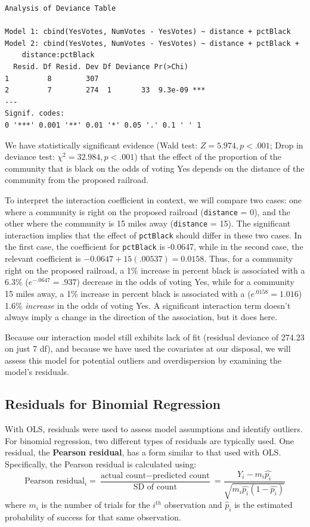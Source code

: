 \documentclass[
]{krantz}
\begin{document}
\begin{verbatim}
Analysis of Deviance Table

Model 1: cbind(YesVotes, NumVotes - YesVotes) ~ distance + pctBlack
Model 2: cbind(YesVotes, NumVotes - YesVotes) ~ distance + pctBlack + 
    distance:pctBlack
  Resid. Df Resid. Dev Df Deviance Pr(>Chi)    
1         8        307                         
2         7        274  1       33  9.3e-09 ***
---
Signif. codes:  
0 '***' 0.001 '**' 0.01 '*' 0.05 '.' 0.1 ' ' 1
\end{verbatim}

We have statistically significant evidence (Wald test: \(Z = 5.974, p<.001\); Drop in deviance test: \(\chi^2=32.984, p<.001\)) that the effect of the proportion of the community that is black on the odds of voting Yes depends on the distance of the community from the proposed railroad.

To interpret the interaction coefficient in context, we will compare two cases: one where a community is right on the proposed railroad (\texttt{distance} = 0), and the other where the community is 15 miles away (\texttt{distance} = 15). The significant interaction implies that the effect of \texttt{pctBlack} should differ in these two cases. In the first case, the coefficient for \texttt{pctBlack} is -0.0647, while in the second case, the relevant coefficient is \(-0.0647+15(.00537) = 0.0158\). Thus, for a community right on the proposed railroad, a 1\% increase in percent black is associated with a 6.3\% (\(e^{-.0647}=.937\)) decrease in the odds of voting Yes, while for a community 15 miles away, a 1\% increase in percent black is associated with a (\(e^{.0158}=1.016\)) 1.6\% \emph{increase} in the odds of voting Yes. A significant interaction term doesn't always imply a change in the direction of the association, but it does here.

Because our interaction model still exhibits lack of fit (residual deviance of 274.23 on just 7 df), and because we have used the covariates at our disposal, we will assess this model for potential outliers and overdispersion by examining the model's residuals.

\hypertarget{residuals-for-binomial-regression}{%
\subsection{Residuals for Binomial Regression}\label{residuals-for-binomial-regression}}

With OLS, residuals were used to assess model assumptions and identify outliers. For binomial regression, two different types of residuals are typically used. One residual, the \textbf{Pearson residual}, has a form similar to that used with OLS. Specifically, the Pearson residual is calculated using:
\begin{equation}
\textrm{Pearson residual}_i = \frac{\textrm{actual count}-\textrm{predicted count}}{\textrm{SD of count}} =
\frac{Y_i-m_i\hat{p_i}}{\sqrt{m_i\hat{p_i}(1-\hat{p_i})}}
\label{eq:pearsonBinom}
\end{equation}
where \(m_i\) is the number of trials for the \(i^{th}\) observation and \(\hat{p}_i\) is the estimated probability of success for that same observation.
\end{document}
